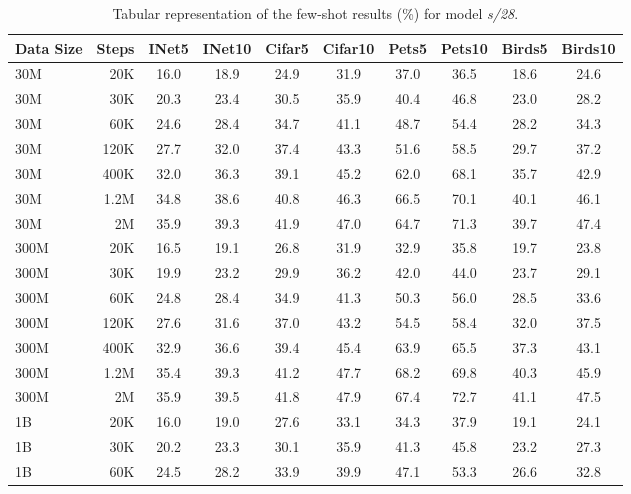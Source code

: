 \begin{table}[t]
  \setlength{\tabcolsep}{5pt}
  \setlength{\extrarowheight}{5pt}
  \renewcommand{\arraystretch}{0.75}
  \centering
  \caption{Tabular representation of the few-shot results (\%) for model \emph{s/28}.}\label{tbl:xs_28}
  \begin{tabulary}{1.0\textwidth}{l r c c c c c c c c}
    \toprule[1pt]
    \bf{Data Size} & \bf{Steps} & \bf{INet5} & \bf{INet10} & \bf{Cifar5} & \bf{Cifar10} & \bf{Pets5} & \bf{Pets10} & \bf{Birds5} & \bf{Birds10} \\
    \midrule
30M   & 20K   & 16.0 & 18.9 & 24.9 & 31.9 & 37.0 & 36.5 & 18.6 & 24.6 \\
30M   & 30K   & 20.3 & 23.4 & 30.5 & 35.9 & 40.4 & 46.8 & 23.0 & 28.2 \\
30M   & 60K   & 24.6 & 28.4 & 34.7 & 41.1 & 48.7 & 54.4 & 28.2 & 34.3 \\
30M   & 120K  & 27.7 & 32.0 & 37.4 & 43.3 & 51.6 & 58.5 & 29.7 & 37.2 \\
30M   & 400K  & 32.0 & 36.3 & 39.1 & 45.2 & 62.0 & 68.1 & 35.7 & 42.9 \\
30M   & 1.2M  & 34.8 & 38.6 & 40.8 & 46.3 & 66.5 & 70.1 & 40.1 & 46.1 \\
30M   & 2M    & 35.9 & 39.3 & 41.9 & 47.0 & 64.7 & 71.3 & 39.7 & 47.4 \\
\midrule[0.25pt]
300M  & 20K   & 16.5 & 19.1 & 26.8 & 31.9 & 32.9 & 35.8 & 19.7 & 23.8 \\
300M  & 30K   & 19.9 & 23.2 & 29.9 & 36.2 & 42.0 & 44.0 & 23.7 & 29.1 \\
300M  & 60K   & 24.8 & 28.4 & 34.9 & 41.3 & 50.3 & 56.0 & 28.5 & 33.6 \\
300M  & 120K  & 27.6 & 31.6 & 37.0 & 43.2 & 54.5 & 58.4 & 32.0 & 37.5 \\
300M  & 400K  & 32.9 & 36.6 & 39.4 & 45.4 & 63.9 & 65.5 & 37.3 & 43.1 \\
300M  & 1.2M  & 35.4 & 39.3 & 41.2 & 47.7 & 68.2 & 69.8 & 40.3 & 45.9 \\
300M  & 2M    & 35.9 & 39.5 & 41.8 & 47.9 & 67.4 & 72.7 & 41.1 & 47.5 \\
\midrule[0.25pt]
1B    & 20K   & 16.0 & 19.0 & 27.6 & 33.1 & 34.3 & 37.9 & 19.1 & 24.1 \\
1B    & 30K   & 20.2 & 23.3 & 30.1 & 35.9 & 41.3 & 45.8 & 23.2 & 27.3 \\
1B    & 60K   & 24.5 & 28.2 & 33.9 & 39.9 & 47.1 & 53.3 & 26.6 & 32.8 \\

\end{tabulary}
\end{table}
